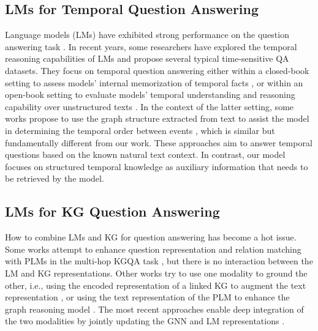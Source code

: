 \documentclass[11pt]{article}
\begin{document}


\subsection{LMs for Temporal Question Answering}

Language models (LMs) have exhibited strong performance on the question answering task \cite{QAbenchmark2}.
In recent years, some researchers have explored the temporal reasoning capabilities of LMs and propose several typical time-sensitive QA datasets.
They focus on temporal question answering either within a closed-book setting to assess models' internal memorization of temporal facts \cite{streamingqa,templama}, or within an open-book setting to evaluate models' temporal understanding and reasoning capability over unstructured texts \cite{situatedqa,timeqa,TEMPReason}.
In the context of the latter setting, some works propose to use the graph structure extracted from text to assist the model in determining the temporal order between events \cite{DocTime,fusetransformer,rememo,TGQA}, which is similar but fundamentally different from our work. 
These approaches aim to answer temporal questions based on the known natural text context. In contrast, our model focuses on structured temporal knowledge as auxiliary information that needs to be retrieved by the model.


\subsection{LMs for KG Question Answering}

How to combine LMs and KG for question answering has become a hot issue. Some works attempt to enhance question representation and relation matching with PLMs in the multi-hop KGQA task \cite{EmbeddedKGQA,subgraphenhanced,unikgqa}, but there is no interaction between the LM and KG representations. Other works try to use one modality to ground the other, i.e., using the encoded representation of a linked KG to augment the text representation \cite{KagNet,KTNET}, or using the text representation of the PLM to enhance the graph reasoning model \cite{Knowledge-AwareQA}.
The most recent approaches enable deep integration of the two modalities by jointly updating the GNN and LM representations \cite{QAGNN, GREASELM}.
\end{document}
